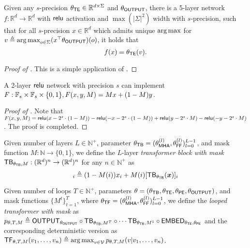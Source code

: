 \begin{lemma}\label{lem:simulating_decoding_embedding}
    Given any $s$-precision $\theta_{\mathsf{TE}}\in\mathbb{R}^{d\times \Sigma}$ and $\theta_{\mathsf{OUTPUT}}$, there is a 5-layer network $f:\mathbb{R}^d\to \mathbb{R}^d$ with $\mathsf{relu}$ activation and $\max(|\Sigma|^2)$ width with $s$-precision, such that for all $s$-precision $x\in\mathbb{R}^d$ which admits unique $\operatorname*{arg\,max}$ for $v\triangleq \operatorname*{arg\,max}_{o\in\Sigma} (x^\top\theta_{\mathsf{OUTPUT}})(o)$, it holds that
    \begin{align*}
        f(x) =  \theta_{\mathsf{TE}}(v).
    \end{align*}
\end{lemma}
\begin{proof}[Proof of ]
    This is a simple application of .
\end{proof}

\begin{lemma}\label{lem:control_gate}
    A 2-layer $\mathsf{relu}$ network with precision $s$ can implement $F:\mathbb{F}_s\times \mathbb{F}_s\times \{0,1\}, F(x,y,M) = Mx + (1-M)y $. 
\end{lemma}
\begin{proof}[Proof of ]
    Note that $F(x,y,M) = \mathsf{relu}(x-2^s\cdot (1-M)) - \mathsf{relu}(-x-2^s\cdot (1-M)) + \mathsf{relu}(y-2^s\cdot M) - \mathsf{relu}(-y-2^s\cdot M)$. The proof is completed.
\end{proof}

\begin{definition}\label{defi:embedding_layer_w_mask}
Given number of layers $L\in\mathbb{N}^+$, parameter $\theta_{\mathsf{TB}} = (\theta^{(l)}_{\mathsf{MHA}},\theta^{(l)}_{\mathsf{FF}} )_{l=0}^{L-1}$, and mask function $M:\mathbb{N}\to\{0,1\}$, we define the $L$-layer \emph{transformer block with mask}$\mathsf{TB}_{\theta_{\mathsf{TB}},M}:(\mathbb{R}^d)^n\to (\mathbb{R}^d)^n$ for any $n\in\mathbb{N}^+$ as 
\begin{equation}
    [\tfblock_{\theta_\tfblock,M}(\vx)]_i \triangleq (1-M(i))x_i + M(i)[\tfblock_{\theta_\tfblock}(\vx)]_i
\end{equation}
\end{definition}

\begin{definition}\label{defi:looped_transformer_w_mask}
Given number of loops $T\in\mathbb{N}^+$,  parameters $\theta = (\theta_{\mathsf{TB}},\theta_{\mathsf{TE}},\theta_{\mathsf{PE}},\theta_{\mathsf{OUTPUT}})$, and mask functions $\{M^t\}_{t=1}^T$, where $\theta_{\mathsf{TF}} = (\theta^{(l)}_{\mathsf{MHA}},\theta^{(l)}_{\mathsf{FF}} )_{l=0}^{L-1}$, we define the \emph{looped transformer with mask} as  $p_{\theta,T,M}\triangleq \mathsf{OUTPUT}_{\theta_{\mathsf{OUTPUT}}}\circ \mathsf{TB}_{\theta_{\mathsf{TB}},M^T}\circ \cdots \mathsf{TB}_{\theta_{\mathsf{TB}},M^1}\circ \mathsf{EMBED}_{\theta_{\mathsf{TE}},\theta_{\mathsf{PE}}}$ and the corresponding deterministic version as $\mathsf{TF}_{\theta,T,M}(v_1,\ldots,v_n) \triangleq \operatorname*{arg\,max}_{v\in\mathcal{V}} p_{\theta,T,M}(v|v_1,\ldots,v_n)$.
\end{definition}

